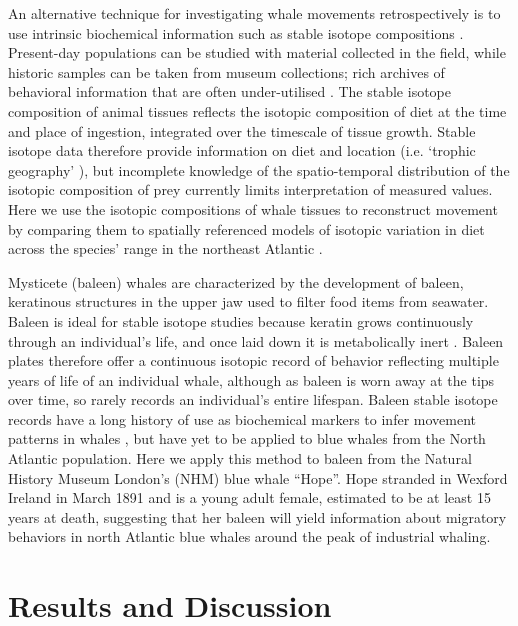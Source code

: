 \documentclass[a4paper,12pt]{article}
\begin{document}
An alternative technique for investigating whale movements retrospectively is to use intrinsic biochemical information such as stable isotope compositions \cite{west2006stable,busquets2017estimating,hobson2008tracking}. 
Present-day populations can be studied with material collected in the field, while historic samples can be taken from museum collections; rich archives of behavioral information that are often under-utilised \cite{lister2011natural}. 
The stable isotope composition of animal tissues reflects the isotopic composition of diet at the time and place of ingestion, integrated over the timescale of tissue growth. 
Stable isotope data therefore provide information on diet and location (i.e. `trophic geography' \cite{bird2018global}), but incomplete knowledge of the spatio-temporal distribution of the isotopic composition of prey currently limits interpretation of measured values. 
Here we use the isotopic compositions of whale tissues to reconstruct movement by comparing them to spatially referenced models of isotopic variation in diet across the species' range in the northeast Atlantic \cite{hobson1999tracing,hobson2008tracking,eisenmann2016isotopic}.

Mysticete (baleen) whales are characterized by the development of baleen, keratinous structures in the upper jaw used to filter food items from seawater. 
Baleen is ideal for stable isotope studies because keratin grows continuously through an individual's life, and once laid down it is metabolically inert \cite{best1996stable,hobson1998stable}. 
Baleen plates therefore offer a continuous isotopic record of behavior reflecting multiple years of life of an individual whale, although as baleen is worn away at the tips over time, so rarely records an individual's entire lifespan. 
Baleen stable isotope records have a long history of use as biochemical markers to infer movement patterns in whales \cite{ryan2013stable,best1996stable,hobson1998stable,hobson2008tracking}, but have yet to be applied to blue whales from the North Atlantic population. 
Here we apply this method to baleen from the Natural History Museum London's (NHM) blue whale ``Hope''. 
Hope stranded in Wexford Ireland in March 1891 and is a young adult female, estimated to be at least 15 years at death, suggesting that her baleen will yield information about migratory behaviors in north Atlantic blue whales around the peak of industrial whaling.

\section{Results and Discussion}
\end{document}
